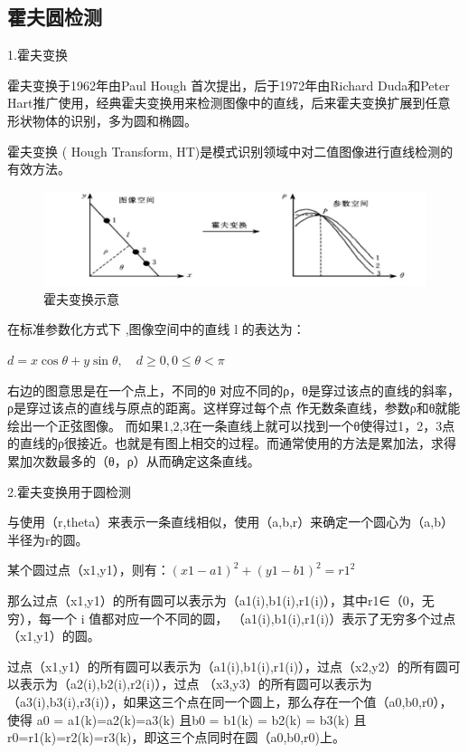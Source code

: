 \subsection{霍夫圆检测}

1.霍夫变换

霍夫变换于1962年由Paul Hough ⾸次提出，后于1972年由Richard Duda和Peter Hart推⼴使⽤，经典霍夫变换⽤来检测图像中的直线，后来霍夫变换扩展到任意形状物体的识别，多为圆和椭圆。

霍夫变换 ( Hough Transform, HT)是模式识别领域中对⼆值图像进⾏直线检测的有效方法。

\begin{figure}[ht]
  \centering
  \includegraphics[width=0.8\linewidth]{./Figure/Hough_Transform.png}
  \caption{霍夫变换示意}\label{Fig:xd1}
\end{figure}

在标准参数化方式下 ,图像空间中的直线 l 的表达为：

$d=x \cos \theta+y \sin \theta, \quad d \geqslant 0,0 \leqslant \theta<\pi$

右边的图意思是在⼀个点上，不同的θ 对应不同的ρ，θ是穿过该点的直线的斜率，ρ是穿过该点的直线与原点的距离。这样穿过每个点 作⽆数条直线，参数ρ和θ就能绘出⼀个正弦图像。 ⽽如果1,2,3在⼀条直线上就可以找到⼀个θ使得过1，2，3点的直线的ρ很接近。也就是有图上相交的过程。而通常使⽤的方法是累加法，求得累加次数最多的（θ，ρ）从⽽确定这条直线。

2.霍夫变换用于圆检测

与使用（r,theta）来表示⼀条直线相似，使⽤（a,b,r）来确定⼀个圆心为（a,b）半径为r的圆。

某个圆过点（x1,y1），则有：$(x1-a1)^2 + (y1-b1)^2 = r1^2$

那么过点（x1,y1）的所有圆可以表⽰为（a1(i),b1(i),r1(i)），其中r1∈（0，⽆穷），每⼀个 i 值都对应⼀个不同的圆， （a1(i),b1(i),r1(i)）表⽰了⽆穷多个过点（x1,y1）的圆。

过点（x1,y1）的所有圆可以表⽰为（a1(i),b1(i),r1(i)），过点（x2,y2）的所有圆可以表⽰为（a2(i),b2(i),r2(i)），过点 （x3,y3）的所有圆可以表⽰为（a3(i),b3(i),r3(i)），如果这三个点在同⼀个圆上，那么存在⼀个值（a0,b0,r0），使得 a0 = a1(k)=a2(k)=a3(k) 且b0 = b1(k) = b2(k) = b3(k) 且r0=r1(k)=r2(k)=r3(k)，即这三个点同时在圆（a0,b0,r0)上。

